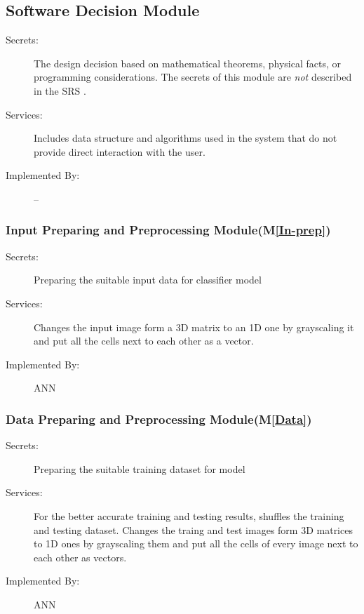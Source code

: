\documentclass[12pt, titlepage]{article}
\newcommand{\mref}[1]{M\ref{#1}}
\begin{document}
\subsection{Software Decision Module}

\begin{description}
\item[Secrets:] The design decision based on mathematical theorems, physical
  facts, or programming considerations. The secrets of this module are
  \emph{not} described in the SRS \cite{SRS}.
\item[Services:] Includes data structure and algorithms used in the system that
  do not provide direct interaction with the user. 
\item[Implemented By:] --
\end{description}

\subsubsection{Input Preparing and Preprocessing Module(\mref{In-prep})}

\begin{description}
  \item[Secrets:]Preparing the suitable input data for classifier model
  \item[Services:]Changes the input image form a 3D matrix to an 1D one by grayscaling it and 
  put all the cells next to each other as a vector.
  \item[Implemented By:] ANN
\end{description}

\subsubsection{Data Preparing and Preprocessing Module(\mref{Data})}

\begin{description}
  \item[Secrets:]Preparing the suitable training dataset for model
  \item[Services:]For the better accurate training and testing results, shuffles the training and testing dataset. 
  Changes the traing and test images form 3D matrices to 1D ones by grayscaling them and 
  put all the cells of every image next to each other as vectors.
  \item[Implemented By:] ANN
\end{description}
\end{document}
